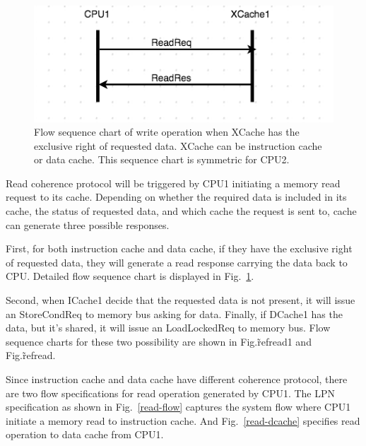 \documentclass[conference]{IEEEtran}
\begin{document}
 \begin{figure} 
 \includegraphics[width=2In]{figures/read1.png}
 \caption{Flow sequence chart of write operation when XCache has the exclusive right of requested data. XCache can be instruction cache or data cache. This sequence chart is symmetric for CPU2. }
 \label{read1}
 \end{figure}

 
Read coherence protocol will be triggered by CPU1 initiating a memory read request to its cache. Depending on whether the required data is included in its cache, the status of requested data,  and which cache the request is sent to, cache can generate three possible responses. 

First, for both instruction cache and data cache, if they have the exclusive right of requested data, they will generate a read response carrying the data back to CPU. Detailed flow sequence chart is displayed in Fig.~\ref{read1}.

Second, when ICache1 decide that the requested data is not present, it will issue an StoreCondReq to memory bus asking for data. Finally, if DCache1 has the data, but it's shared, it will issue an LoadLockedReq to memory bus. Flow sequence charts for these two possibility are shown in Fig.\~ref{read1} and Fig.\~ref{read}.
 
Since instruction cache and data cache have different coherence protocol, there are two flow specifications for read operation generated by CPU1. The LPN specification as shown in Fig.~\ref{read-flow} captures the system flow where CPU1 initiate a memory read to instruction cache. And Fig.~\ref{read-dcache} specifies read operation to data cache from CPU1.
\end{document}

